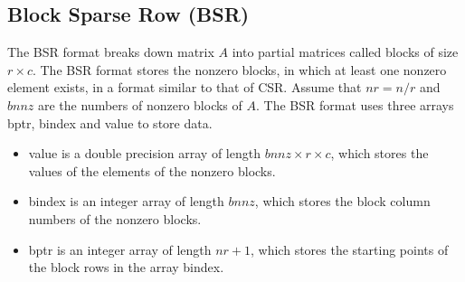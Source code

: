\documentclass[a4paper]{article}
\begin{document}
\newpage
\subsection{Block Sparse Row (BSR)}
The BSR format breaks down matrix $A$ into partial matrices called blocks of size $r \times c$. 
The BSR format stores the nonzero blocks, in which at least one nonzero
element exists, in a format similar to that of CSR. 
Assume that $nr=n/r$ and $bnnz$ are the numbers of nonzero blocks of $A$. 
The BSR format uses three arrays {\ttfamily bptr}, {\ttfamily bindex} and {\ttfamily value} to store data.
\begin{itemize}
\item {\ttfamily value} is a double precision array of length
      $bnnz \times r \times c$, which stores the values of the elements of the nonzero blocks.
\item {\ttfamily bindex} is an integer array of length $bnnz$,
      which stores the block column numbers of the nonzero blocks.
\item {\ttfamily bptr} is an integer array of length $nr+1$,
      which stores the starting points of the block rows in the array {\ttfamily bindex}.
\end{itemize}
\end{document}

